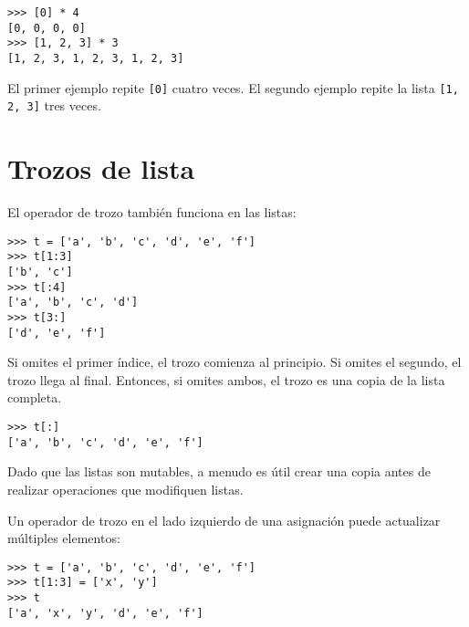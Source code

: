 \documentclass[10pt]{book}
\begin{document}
\begin{verbatim}
>>> [0] * 4
[0, 0, 0, 0]
>>> [1, 2, 3] * 3
[1, 2, 3, 1, 2, 3, 1, 2, 3]
\end{verbatim}
%
El primer ejemplo repite {\tt [0]} cuatro veces.  El segundo ejemplo
repite la lista {\tt [1, 2, 3]} tres veces.


\section{Trozos de lista}

El operador de trozo también funciona en las listas:

\begin{verbatim}
>>> t = ['a', 'b', 'c', 'd', 'e', 'f']
>>> t[1:3]
['b', 'c']
>>> t[:4]
['a', 'b', 'c', 'd']
>>> t[3:]
['d', 'e', 'f']
\end{verbatim}
%
Si omites el primer índice, el trozo comienza al principio.
Si omites el segundo, el trozo llega al final.  Entonces, si
omites ambos, el trozo es una copia de la lista completa.

\begin{verbatim}
>>> t[:]
['a', 'b', 'c', 'd', 'e', 'f']
\end{verbatim}
%
Dado que las listas son mutables, a menudo es útil crear una copia
antes de realizar operaciones que modifiquen listas.

Un operador de trozo en el lado izquierdo de una asignación
puede actualizar múltiples elementos:

\begin{verbatim}
>>> t = ['a', 'b', 'c', 'd', 'e', 'f']
>>> t[1:3] = ['x', 'y']
>>> t
['a', 'x', 'y', 'd', 'e', 'f']
\end{verbatim}
%


%

%
\end{document}
